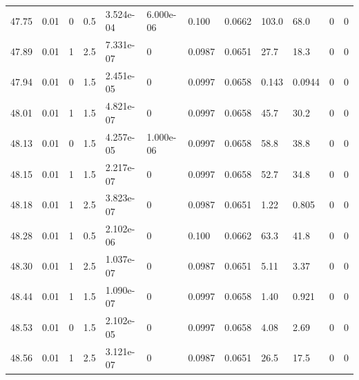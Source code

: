 \documentclass[preview]{standalone}
\begin{document}
{{{{{{{{{{\begin{tabular}{L{1.2cm}C{1.2cm} C{0.3cm}C{0.5cm} C{1.4cm}C{1.4cm} C{1.4cm}C{1.4cm} C{1.6cm}C{1.6cm} C{1.6cm}C{1.6cm}}
  47.75  &  0.01  & 0     & 0.5 &  3.524e-04  & 6.000e-06  &  0.100&   0.0662& 103.0 & 68.0   &  0 & 0  \\ 
  47.89  &  0.01  & 1     & 2.5 &  7.331e-07  & 0  &  0.0987&   0.0651& 27.7 & 18.3   &  0 & 0  \\ 
  47.94  &  0.01  & 0     & 1.5 &  2.451e-05  & 0  &  0.0997&   0.0658& 0.143 & 0.0944   &  0 & 0  \\ 
  48.01  &  0.01  & 1     & 1.5 &  4.821e-07  & 0  &  0.0997&   0.0658& 45.7 & 30.2   &  0 & 0  \\ 
  48.13  &  0.01  & 0     & 1.5 &  4.257e-05  & 1.000e-06  &  0.0997&   0.0658& 58.8 & 38.8   &  0 & 0  \\ 
  48.15  &  0.01  & 1     & 1.5 &  2.217e-07  & 0  &  0.0997&   0.0658& 52.7 & 34.8   &  0 & 0  \\ 
  48.18  &  0.01  & 1     & 2.5 &  3.823e-07  & 0  &  0.0987&   0.0651& 1.22 & 0.805   &  0 & 0  \\ 
  48.28  &  0.01  & 1     & 0.5 &  2.102e-06  & 0  &  0.100&   0.0662& 63.3 & 41.8   &  0 & 0  \\ 
  48.30  &  0.01  & 1     & 2.5 &  1.037e-07  & 0  &  0.0987&   0.0651& 5.11 & 3.37   &  0 & 0  \\ 
  48.44  &  0.01  & 1     & 1.5 &  1.090e-07  & 0  &  0.0997&   0.0658& 1.40 & 0.921   &  0 & 0  \\ 
  48.53  &  0.01  & 0     & 1.5 &  2.102e-05  & 0  &  0.0997&   0.0658& 4.08 & 2.69   &  0 & 0  \\ 
  48.56  &  0.01  & 1     & 2.5 &  3.121e-07  & 0  &  0.0987&   0.0651& 26.5 & 17.5   &  0 & 0  \\ 
\hline 
\end{tabular} 

}}}}}}}}}}
\end{document}
